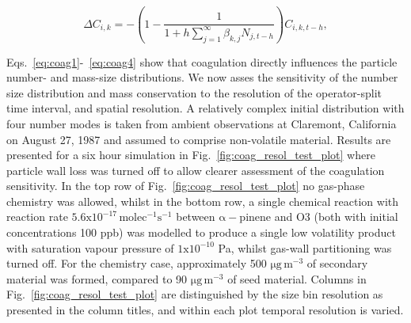 \documentclass[gmd, manuscript]{copernicus}
\begin{document}
\begin{equation} \label{eq:coag4}
\Delta C_{i,k} = -\left(1-\frac{1}{1+h\sum_{j=1}^{\infty}\beta_{k,j}N_{j,t-h}}\right)C_{i,k,t-h},
\end{equation}

Eqs.~\ref{eq:coag1}-~\ref{eq:coag4} show that coagulation directly influences the particle number- and mass-size distributions.  We now asses the sensitivity of the number size distribution and mass conservation to the resolution of the operator-split time interval, and spatial resolution.  A relatively complex initial distribution with four number modes is taken from ambient observations at Claremont, California on August 27, 1987 \citep{Jacobson2005} and assumed to comprise non-volatile material.  Results are presented for a six hour simulation in Fig.~\ref{fig:coag_resol_test_plot} where particle wall loss was turned off to allow clearer assessment of the coagulation sensitivity.  In the top row of Fig.~\ref{fig:coag_resol_test_plot} no gas-phase chemistry was allowed, whilst in the bottom row, a single chemical reaction with reaction rate $\mathrm{5.6x10^{-17}\, molec^{-1}s^{-1}}$  between $\mathrm{\alpha-}$pinene and O3 (both with initial concentrations 100 ppb) was modelled to produce a single low volatility product with saturation vapour pressure of $\mathrm{1x10^{-10}}$ Pa, whilst gas-wall partitioning was turned off.  For the chemistry case, approximately 500 $\mathrm{\mu g\, m^{-3}}$ of secondary material was formed, compared to  90 $\mathrm{\mu g\,m^{-3}}$ of seed material.  Columns in Fig.~\ref{fig:coag_resol_test_plot} are distinguished by the size bin resolution as presented in the column titles, and within each plot temporal resolution is varied.
\end{document}
